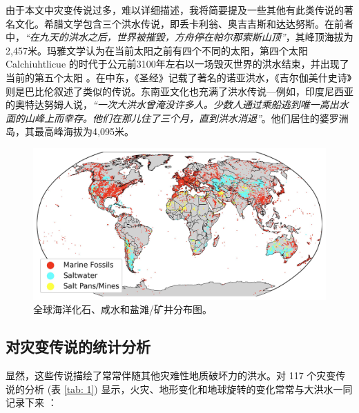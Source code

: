 \documentclass[10pt,twocolumn,letterpaper]{article}
\begin{document}
由于本文中灾变传说过多，难以详细描述，我将简要提及一些其他有此类传说的著名文化。希腊文学包含三个洪水传说，即丢卡利翁、奥吉吉斯和达达努斯\cite{9,10}。在前者中，\textit{“在九天的洪水之后，世界被摧毁，方舟停在帕尔那索斯山顶”}，其峰顶海拔为2,457米\cite{11}。玛雅文学认为在当前太阳之前有四个不同的太阳，第四个太阳 Calchiuhtlicue 的时代于公元前3100年左右以一场毁灭世界的洪水结束，并出现了当前的第五个太阳 \cite{12}。在中东，《圣经》记载了著名的诺亚洪水，《吉尔伽美什史诗》则是巴比伦叙述了类似的传说\cite{13}。东南亚文化也充满了洪水传说—例如，印度尼西亚的奥特达努姆人说，\textit{“一次大洪水曾淹没许多人。少数人通过乘船逃到唯一高出水面的山峰上而幸存。他们在那儿住了三个月，直到洪水消退”}\cite{3}。他们居住的婆罗洲岛，其最高峰海拔为4,095米。

\begin{figure}[t]
\begin{center}
\includegraphics[width=1\textwidth]{marine.jpg}
\end{center}
   \caption{全球海洋化石、咸水和盐滩/矿井分布图\cite{15,16,86,87}。}
   \label{fig:2}
\end{figure}

\subsection{对灾变传说的统计分析}

显然，这些传说描绘了常常伴随其他灾难性地质破坏力的洪水。对 117 个灾变传说的分析 (表 \ref{tab: 1}) 显示，火灾、地形变化和地球旋转的变化常常与大洪水一同记录下来 \cite{14}：
\end{document}
